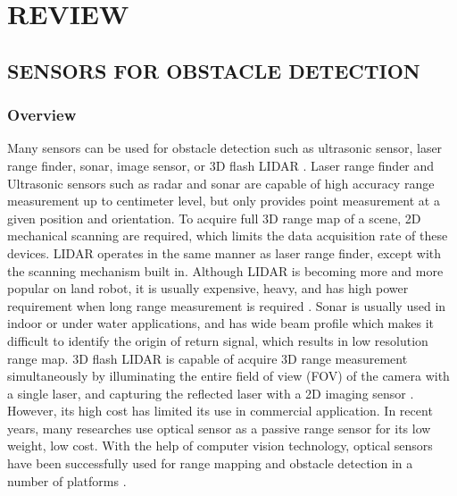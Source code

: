 \chapter{REVIEW}\label{ch:Review}

\section{SENSORS FOR OBSTACLE DETECTION}\label{sec:sensor}

\subsection{Overview}\label{sec:SensorOverview}
Many sensors can be used for obstacle detection such as ultrasonic
sensor, laser range finder, sonar, image sensor, or 3D flash LIDAR
\cite{de_angelis_low-cost_2007} \cite{alonge_novel_2009}
\cite{harb_neural_2008} \cite{saad_robust_2011}
\cite{williams_efficient_2001} \cite{chong_feature-based_1999}
\cite{hanna_obstacle_2008} \cite{lu_distance_2010}
\cite{civera_inverse_2008} \cite{jirawimut_visual_2003}
\cite{amzajerdian_lidar_2011}. Laser range finder and Ultrasonic
sensors such as radar and sonar are capable of high accuracy range
measurement up to centimeter level, but only provides point
measurement at a given position and orientation. To acquire full 3D
range map of a scene, 2D mechanical scanning are required, which
limits the data acquisition rate of these devices. LIDAR operates in
the same manner as laser range finder, except with the scanning
mechanism built in. Although LIDAR is becoming more and more popular
on land robot, it is usually expensive, heavy,
\cite{subharsanan_low_2013} and has high power requirement when long
range measurement is required \cite{lemmens_airborne_2007}. Sonar is
usually used in indoor or under water applications, and has wide beam
profile which makes it difficult to identify the origin of return
signal, which results in low resolution range map. 3D flash LIDAR is
capable of acquire 3D range measurement simultaneously by illuminating
the entire field of view (FOV) of the camera with a single laser, and
capturing the reflected laser with a 2D imaging sensor
\cite{amzajerdian_lidar_2011}. However, its high cost has limited its
use in commercial application. In recent years, many researches use
optical sensor as a passive range sensor for its low weight, low cost.
With the help of computer vision technology, optical sensors have been
successfully used for range mapping and obstacle detection in a number
of platforms \cite{einhorn_cant_2010} \cite{hashimoto_detection_1996}
\cite{yamaguchi_moving_2006} \cite{zhang_obstacle_2012}
\cite{maier_self-supervised_2011} \cite{kubota_global_2007}
\cite{xu_method_2009} \cite{hanna_obstacle_2008}
\cite{zhang_real-time_2012} \cite{van_der_mark_stereo_2007}
\cite{broggi_stereo_2011}.

